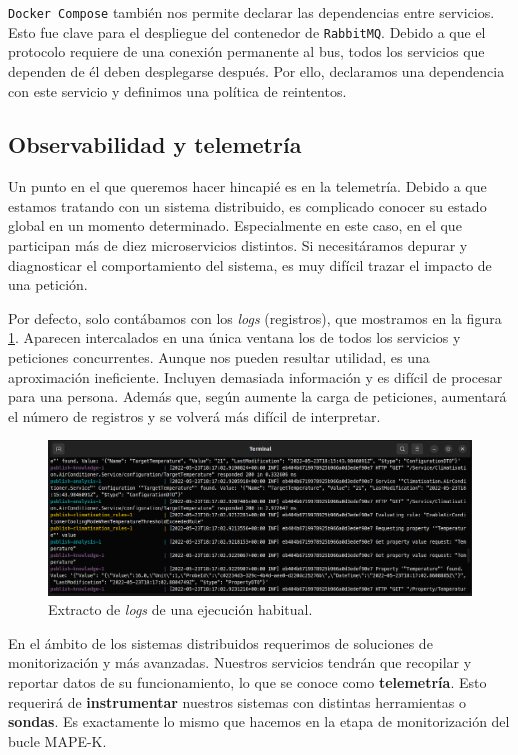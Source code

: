 \texttt{Docker Compose} también nos permite declarar las dependencias entre servicios. Esto fue clave para el despliegue del contenedor de \texttt{RabbitMQ}. Debido a que el protocolo requiere de una conexión permanente al bus\cite{johanssonPartRabbitMQBest2019}, todos los servicios que dependen de él deben desplegarse después. Por ello, declaramos una dependencia con este servicio y definimos una política de reintentos.

\subsection{Observabilidad y telemetría}

Un punto en el que queremos hacer hincapié es en la telemetría. Debido a que estamos tratando con un sistema distribuido, es complicado conocer su estado global en un momento determinado. Especialmente en este caso, en el que participan más de diez microservicios distintos. Si necesitáramos depurar y diagnosticar el comportamiento del sistema, es muy difícil trazar el impacto de una petición.

Por defecto, solo contábamos con los \emph{logs} (registros), que mostramos en la figura \ref{fig:console-logs}. Aparecen intercalados en una única ventana los de todos los servicios y peticiones concurrentes. Aunque nos pueden resultar utilidad, es una aproximación ineficiente. Incluyen demasiada información y es difícil de procesar para una persona. Además que, según aumente la carga de peticiones, aumentará el número de registros y se volverá más difícil de interpretar.

\begin{figure}[h]
  \centering
  \includegraphics[scale=1.35]{cap_despliegue/images/console-logs}
  \caption{Extracto de \emph{logs} de una ejecución habitual.}
  \label{fig:console-logs}
\end{figure}

En el ámbito de los sistemas distribuidos requerimos de soluciones de monitorización y  más avanzadas. \cite{newmanBuildingMicroservicesDesigning2021} Nuestros servicios tendrán que recopilar y reportar datos de su funcionamiento, lo que se conoce como \textbf{telemetría}. Esto requerirá de \textbf{instrumentar} nuestros sistemas con distintas herramientas o \textbf{sondas}. Es exactamente lo mismo que hacemos en la etapa de monitorización del bucle MAPE-K.

